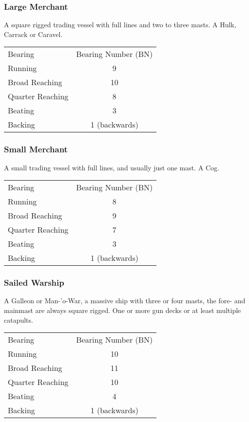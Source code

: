 \documentclass[11pt]{wbzine}
\begin{document}
\begin{multicols}{2}
\subsubsection{Large Merchant}

A square rigged trading vessel with full lines and two to three masts. A
Hulk, Carrack or Caravel.

\begin{tabularx}{\columnwidth}{Zc}
Bearing & Bearing Number (BN) \\
Running & 9 \\
Broad Reaching & 10 \\
Quarter Reaching & 8 \\
Beating & 3 \\
Backing & 1 (backwards) \\
\end{tabularx}

\subsubsection{Small Merchant}

A small trading vessel with full lines, and usually just one mast. A
Cog.

\begin{tabularx}{\columnwidth}{Zc}
Bearing & Bearing Number (BN) \\
Running & 8 \\
Broad Reaching & 9 \\
Quarter Reaching & 7 \\
Beating & 3 \\
Backing & 1 (backwards) \\
\end{tabularx}

\subsubsection{Sailed Warship}

A Galleon or Man-'o-War, a massive ship with three or four masts, the
fore- and mainmast are always square rigged. One or more gun decks or at
least multiple catapults.

\begin{tabularx}{\columnwidth}{Zc}
Bearing & Bearing Number (BN) \\
Running & 10 \\
Broad Reaching & 11 \\
Quarter Reaching & 10 \\
Beating & 4 \\
Backing & 1 (backwards) \\
\end{tabularx}


\end{multicols}
\end{document}

